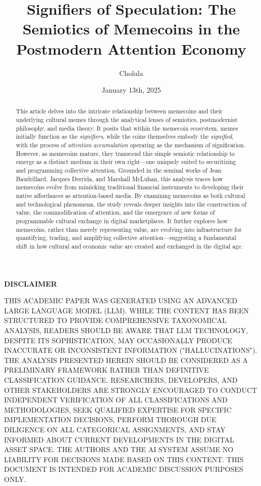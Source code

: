 \documentclass[a4paper,12pt]{article}
\begin{document}
\title{Signifiers of Speculation: The Semiotics of Memecoins in the Postmodern Attention Economy}
\author{Cholula}
\date{January 13th, 2025}

\maketitle

\begin{abstract}
This article delves into the intricate relationship between memecoins and their underlying cultural memes through the analytical lenses of semiotics, postmodernist philosophy, and media theory. It posits that within the memecoin ecosystem, memes initially function as the \textit{signifiers}, while the coins themselves embody the \textit{signified}, with the process of \textit{attention accumulation} operating as the mechanism of signification. However, as memecoins mature, they transcend this simple semiotic relationship to emerge as a distinct medium in their own right—one uniquely suited to securitizing and programming collective attention. Grounded in the seminal works of Jean Baudrillard, Jacques Derrida, and Marshall McLuhan, this analysis traces how memecoins evolve from mimicking traditional financial instruments to developing their native affordances as attention-based media. By examining memecoins as both cultural and technological phenomena, the study reveals deeper insights into the construction of value, the commodification of attention, and the emergence of new forms of programmable cultural exchange in digital marketplaces. It further explores how memecoins, rather than merely representing value, are evolving into infrastructure for quantifying, trading, and amplifying collective attention—suggesting a fundamental shift in how cultural and economic value are created and exchanged in the digital age.
\end{abstract}

\begin{center}
\begin{minipage}{0.9\textwidth}
\small
\begin{center}
\textbf{DISCLAIMER}
\end{center}
THIS ACADEMIC PAPER WAS GENERATED USING AN ADVANCED LARGE LANGUAGE MODEL (LLM). WHILE THE CONTENT HAS BEEN STRUCTURED TO PROVIDE COMPREHENSIVE TAXONOMICAL ANALYSIS, READERS SHOULD BE AWARE THAT LLM TECHNOLOGY, DESPITE ITS SOPHISTICATION, MAY OCCASIONALLY PRODUCE INACCURATE OR INCONSISTENT INFORMATION ("HALLUCINATIONS"). THE ANALYSIS PRESENTED HEREIN SHOULD BE CONSIDERED AS A PRELIMINARY FRAMEWORK RATHER THAN DEFINITIVE CLASSIFICATION GUIDANCE. RESEARCHERS, DEVELOPERS, AND OTHER STAKEHOLDERS ARE STRONGLY ENCOURAGED TO CONDUCT INDEPENDENT VERIFICATION OF ALL CLASSIFICATIONS AND METHODOLOGIES, SEEK QUALIFIED EXPERTISE FOR SPECIFIC IMPLEMENTATION DECISIONS, PERFORM THOROUGH DUE DILIGENCE ON ALL CATEGORICAL ASSIGNMENTS, AND STAY INFORMED ABOUT CURRENT DEVELOPMENTS IN THE DIGITAL ASSET SPACE. THE AUTHORS AND THE AI SYSTEM ASSUME NO LIABILITY FOR DECISIONS MADE BASED ON THIS CONTENT. THIS DOCUMENT IS INTENDED FOR ACADEMIC DISCUSSION PURPOSES ONLY.
\end{minipage}
\end{center}
\end{document}
